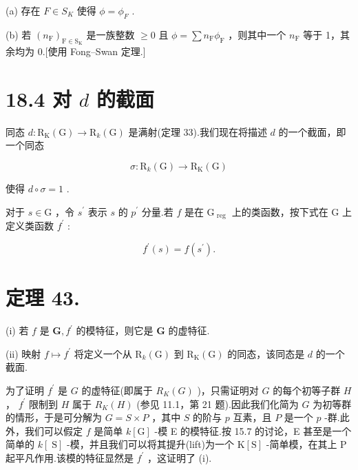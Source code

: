\documentclass[10pt]{article}
\begin{document}
(a) 存在 \(F \in  {S}_{K}\) 使得 \(\phi  = {\phi }_{F}\) .

(b) 若 \({\left( {n}_{\mathrm{F}}\right) }_{\mathrm{F} \in  {\mathrm{S}}_{\mathrm{K}}}\) 是一族整数 \(\geq  0\) 且 \(\phi  = \sum {n}_{\mathrm{F}}{\phi }_{\mathrm{F}}\) ，则其中一个 \({n}_{\mathrm{F}}\) 等于 1，其余均为 0.[使用 Fong–Swan 定理.]

\section*{18.4 对 \(d\) 的截面}

同态 \(d : {\mathrm{R}}_{\mathrm{K}}\left( \mathrm{G}\right)  \rightarrow  {\mathrm{R}}_{k}\left( \mathrm{G}\right)\) 是满射(定理 33).我们现在将描述 \(d\) 的一个截面，即一个同态

\[
\sigma  : {\mathrm{R}}_{k}\left( \mathrm{G}\right)  \rightarrow  {\mathrm{R}}_{\mathrm{K}}\left( \mathrm{G}\right)
\]

使得 \(d \circ  \sigma  = 1\) .

对于 \(s \in  \mathrm{G}\) ，令 \({s}^{\prime }\) 表示 \(s\) 的 \({p}^{\prime }\) 分量.若 \(f\) 是在 \({\mathrm{G}}_{\text{ reg }}\) 上的类函数，按下式在 \(\mathrm{G}\) 上定义类函数 \({f}^{\prime }\) :

\[
{f}^{\prime }\left( s\right)  = f\left( {s}^{\prime }\right) .
\]

\section*{定理 43.}

(i) 若 \(f\) 是 \(\mathbf{G},{f}^{\prime }\) 的模特征，则它是 \(\mathbf{G}\) 的虚特征.

(ii) 映射 \(f \mapsto  {f}^{\prime }\) 将定义一个从 \({\mathrm{R}}_{k}\left( \mathrm{G}\right)\) 到 \({\mathrm{R}}_{\mathrm{K}}\left( \mathrm{G}\right)\) 的同态，该同态是 \(d\) 的一个截面.

为了证明 \({f}^{\prime }\) 是 \(G\) 的虚特征(即属于 \({R}_{K}\left( G\right)\) )，只需证明对 \(G\) 的每个初等子群 \(H\) ， \({f}^{\prime }\) 限制到 \(H\) 属于 \({R}_{K}\left( H\right)\) (参见 11.1，第 21 题).因此我们化简为 \(G\) 为初等群的情形，于是可分解为 \(G = S \times  P\) ，其中 \(S\) 的阶与 \(p\) 互素，且 \(P\) 是一个 \(p\) -群.此外，我们可以假定 \(f\) 是简单 \(k\left\lbrack  \mathrm{G}\right\rbrack\) -模 E 的模特征.按 15.7 的讨论，E 甚至是一个简单的 \(k\left\lbrack  \mathrm{\;S}\right\rbrack\) -模，并且我们可以将其提升(lift)为一个 \(\mathrm{K}\left\lbrack  \mathrm{S}\right\rbrack\) -简单模，在其上 \(\mathrm{P}\) 起平凡作用.该模的特征显然是 \({f}^{\prime }\) ，这证明了 (i).
\end{document}
